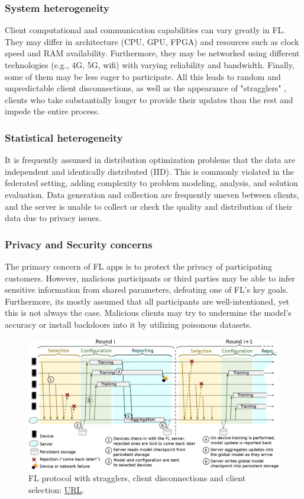 \subsubsection{System heterogeneity} %
Client computational and communication capabilities can vary greatly in FL. They may differ in architecture (CPU, GPU, FPGA) and resources such as clock speed and RAM availability. Furthermore, they may be networked using different technologies (e.g., 4G, 5G, wifi) with varying reliability and bandwidth. Finally, some of them may be less eager to participate. All this leads to random and unpredictable client disconnections, as well as the appearance of "stragglers" \cite{stragglers}, clients who take substantially longer to provide their updates than the rest and impede the entire process.

\subsubsection{Statistical heterogeneity} %
It is frequently assumed in distribution optimization problems that the data are independent and identically distributed (IID). This is commonly violated in the federated setting, adding complexity to problem modeling, analysis, and solution evaluation. Data generation and collection are frequently uneven between clients, and the server is unable to collect or check the quality and distribution of their data due to privacy issues.

\subsubsection{Privacy and Security concerns} %
The primary concern of FL apps is to protect the privacy of participating customers. However, malicious participants or third parties may be able to infer sensitive information from shared parameters, defeating one of FL's key goals. Furthermore, its mostly assumed that all participants are well-intentioned, yet this is not always the case. Malicious clients may try to undermine the model's accuracy or install backdoors into it by utilizing poisonous datasets.
    
\begin{figure}[H]
    \centering
        \includegraphics[width=1\textwidth]{Images/fl_protocol.png}
        \decoRule
        \caption[FL protocol]{FL protocol with stragglers, client disconnections and client selection: \href{https://ieeexplore.ieee.org/document/9060868}{URL}.}
        \label{fig:FL protocol}
\end{figure}

